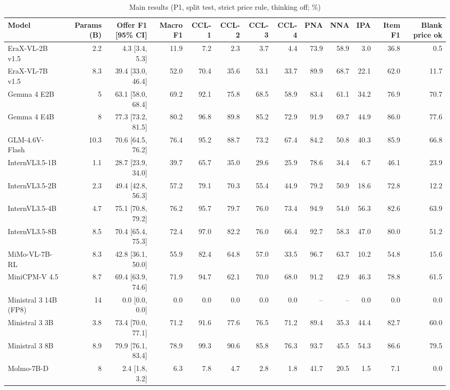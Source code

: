 \begin{table}[t]
\centering
\caption{Main results (P1, split test, strict price rule, thinking off; \%)}
\label{tab:main}
\small
\begin{tabular}{lrrrrrrrrrrrr}
\toprule
Model & Params (B) & Offer F1 [95\% CI] & Macro F1 & CCL-1 & CCL-2 & CCL-3 & CCL-4 & PNA & NNA & IPA & Item F1 & Blank price ok \\
\midrule
EraX-VL-2B v1.5 & 2.2 & 4.3 [3.4, 5.3] & 11.9 & 7.2 & 2.3 & 3.7 & 4.4 & 73.9 & 58.9 & 3.0 & 36.8 & 0.5 \\
EraX-VL-7B v1.5 & 8.3 & 39.4 [33.0, 46.4] & 52.0 & 70.4 & 35.6 & 53.1 & 33.7 & 89.9 & 68.7 & 22.1 & 62.0 & 11.7 \\
Gemma 4 E2B & 5 & 63.1 [58.0, 68.4] & 69.2 & 92.1 & 75.8 & 68.5 & 58.9 & 83.4 & 61.1 & 34.2 & 76.9 & 70.7 \\
Gemma 4 E4B & 8 & 77.3 [73.2, 81.5] & 80.2 & 96.8 & 89.8 & 85.2 & 72.9 & 91.9 & 69.7 & 44.9 & 86.0 & 77.6 \\
GLM-4.6V-Flash & 10.3 & 70.6 [64.5, 76.2] & 76.4 & 95.2 & 88.7 & 73.2 & 67.4 & 84.2 & 50.8 & 40.3 & 85.9 & 66.8 \\
InternVL3.5-1B & 1.1 & 28.7 [23.9, 34.0] & 39.7 & 65.7 & 35.0 & 29.6 & 25.9 & 78.6 & 34.4 & 6.7 & 46.1 & 23.9 \\
InternVL3.5-2B & 2.3 & 49.4 [42.8, 56.3] & 57.2 & 79.1 & 70.3 & 55.4 & 44.9 & 79.2 & 50.9 & 18.6 & 72.8 & 12.2 \\
InternVL3.5-4B & 4.7 & 75.1 [70.8, 79.2] & 76.2 & 95.7 & 79.7 & 76.0 & 73.4 & 94.9 & 54.0 & 56.3 & 82.6 & 63.9 \\
InternVL3.5-8B & 8.5 & 70.4 [65.4, 75.3] & 72.4 & 97.0 & 82.2 & 76.0 & 66.4 & 92.7 & 58.3 & 47.0 & 80.0 & 51.2 \\
MiMo-VL-7B-RL & 8.3 & 42.8 [36.1, 50.0] & 55.9 & 82.4 & 64.8 & 57.0 & 33.5 & 96.7 & 63.7 & 10.2 & 54.8 & 15.6 \\
MiniCPM-V 4.5 & 8.7 & 69.4 [63.9, 74.6] & 71.9 & 94.7 & 62.1 & 70.0 & 68.0 & 91.2 & 42.9 & 46.3 & 78.8 & 61.5 \\
Ministral 3 14B (FP8) & 14 & 0.0 [0.0, 0.0] & 0.0 & 0.0 & 0.0 & 0.0 & 0.0 & – & – & 0.0 & 0.0 & 0.0 \\
Ministral 3 3B & 3.8 & 73.4 [70.0, 77.1] & 71.2 & 91.6 & 77.6 & 76.5 & 71.2 & 89.4 & 35.3 & 44.4 & 82.7 & 60.0 \\
Ministral 3 8B & 8.9 & 79.9 [76.1, 83.4] & 78.9 & 99.3 & 90.6 & 85.8 & 76.3 & 93.7 & 45.5 & 54.3 & 86.6 & 79.5 \\
Molmo-7B-D & 8 & 2.4 [1.8, 3.2] & 6.3 & 7.8 & 4.7 & 2.8 & 1.8 & 41.7 & 20.5 & 1.5 & 7.1 & 0.0 \\

\end{tabular}
\end{table}
